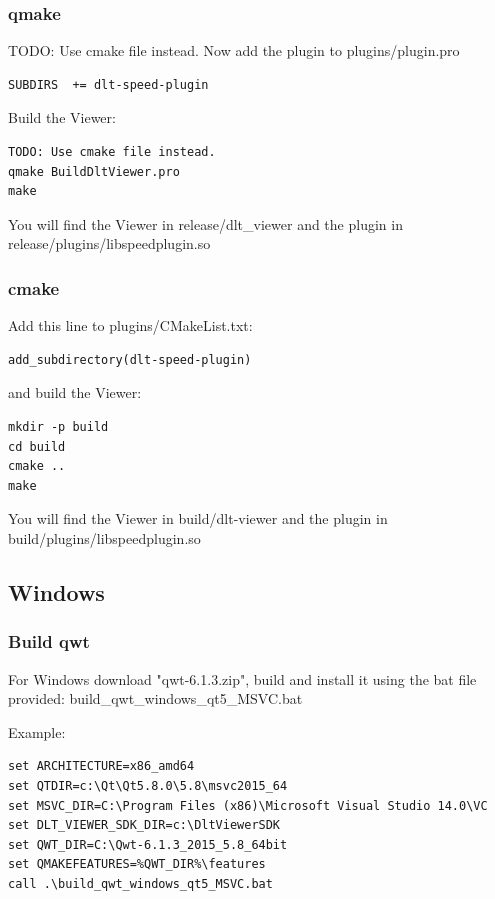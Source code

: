 \documentclass[a4paper,11pt]{article}
\begin{document}
\subsubsection{qmake}

TODO: Use cmake file instead.
Now add the plugin to plugins/plugin.pro

\begin{verbatim}
SUBDIRS  += dlt-speed-plugin
\end{verbatim}

Build the Viewer:
\begin{verbatim}
TODO: Use cmake file instead.
qmake BuildDltViewer.pro
make
\end{verbatim}

You will find the Viewer in release/dlt\_viewer and the plugin in release/plugins/libspeedplugin.so

\subsubsection{cmake}

Add this line to plugins/CMakeList.txt:

\begin{verbatim}
add_subdirectory(dlt-speed-plugin)
\end{verbatim}

and build the Viewer:

\begin{verbatim}
mkdir -p build
cd build
cmake ..
make
\end{verbatim}

You will find the Viewer in build/dlt-viewer and the plugin in build/plugins/libspeedplugin.so

\subsection{Windows}

\subsubsection{Build qwt}

For Windows download "qwt-6.1.3.zip", build and install it using the bat file provided:
build\_qwt\_windows\_qt5\_MSVC.bat

Example:
\begin{verbatim}
set ARCHITECTURE=x86_amd64
set QTDIR=c:\Qt\Qt5.8.0\5.8\msvc2015_64
set MSVC_DIR=C:\Program Files (x86)\Microsoft Visual Studio 14.0\VC
set DLT_VIEWER_SDK_DIR=c:\DltViewerSDK
set QWT_DIR=C:\Qwt-6.1.3_2015_5.8_64bit
set QMAKEFEATURES=%QWT_DIR%\features
call .\build_qwt_windows_qt5_MSVC.bat
\end{verbatim}
\end{document}
